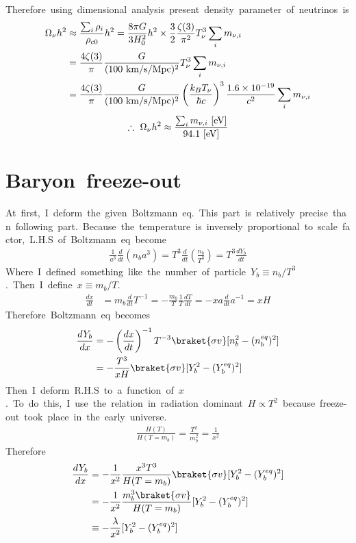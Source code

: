 Therefore\ using\ dimensional\ analysis\ present\ density\ parameter\ of\ neutrinos\ is
\begin{align*}
    \Omega_{\nu}h^2&\approx\frac{\sum_i\rho_i}{\rho_{c0}}h^2=\frac{8\pi G}{3H^2_0}h^2\times\frac{3}{2}\frac{\zeta(3)}{\pi^2}T^3_{\nu}\sum_im_{\nu,i}\\
    &=\frac{4\zeta(3)}{\pi}\frac{G}{(100\ \rm{km/s/Mpc})^2}T^3_{\nu}\sum_im_{\nu,i}\\
    &=\frac{4\zeta(3)}{\pi}\frac{G}{(100\ \rm{km/s/Mpc})^2}\left(\frac{k_BT_{\nu}}{\hbar c}\right)^3\frac{1.6\times10^{-19}}{c^2}\sum_im_{\nu,i}
\end{align*}
\begin{align}
    \therefore\ \Omega_{\nu}h^2\approx\frac{\sum_im_{\nu,i}\ \rm{[eV]}}{94.1\ \rm{[eV]}}
\end{align}

\section{Baryon\ freeze-out}
At\ first,\ I\ deform\ the\ given\ Boltzmann\ eq.\ This\ part\ is\ relatively\ precise\ than\ following\ part.\ Because\ the\ temperature\ is\ inversely\ proportional\ to\ scale\ factor,\ L.H.S\ of\ Boltzmann\ eq\ become
\begin{align*}
    \frac{1}{a^3}\frac{d}{dt}(n_ba^3)=T^3\frac{d}{dt}\left(\frac{n_b}{T^3}\right)=T^3\frac{dY_b}{dt}
\end{align*}
Where\ I\ defined\ something\ like\ the\ number\ of\ particle\ $Y_b\equiv n_b/T^3$.\ Then\ I\ define\ $x\equiv m_b/T$.
\begin{align*}
    \frac{dx}{dt}&=m_b\frac{d}{dt}T^{-1}=-\frac{m_b}{T}\frac{1}{T}\frac{dT}{dt}=-xa\frac{d}{dt}a^{-1}=xH
\end{align*}
Therefore\ Boltzmann\ eq\ becomes
\begin{align*}
    \frac{dY_b}{dx}&=-\left(\frac{dx}{dt}\right)^{-1}T^{-3}\braket{\sigma v}[n_b^2-(n_b^{eq})^2]\\
    &=-\frac{T^3}{xH}\braket{\sigma v}[Y_b^2-(Y_b^{eq})^2]
\end{align*}
Then\ I\ deform\ R.H.S\ to\ a\ function\ of\ $x$.\ To\ do\ this,\ I\ use\ the\ relation\ in\ radiation\ dominant\ $H\propto T^2$\ because\ freeze-out\ took\ place\ in\ the\ early\ universe.
\begin{align*}
    \frac{H(T)}{H(T=m_b)}=\frac{T^2}{m_b^2}=\frac{1}{x^2}
\end{align*}
Therefore
\begin{align*}
    \frac{dY_b}{dx}&=-\frac{1}{x^2}\frac{x^3T^3}{H(T=m_b)}\braket{\sigma v}[Y_b^2-(Y_b^{eq})^2]\\
    &=-\frac{1}{x^2}\frac{m_b^3\braket{\sigma v}}{H(T=m_b)}[Y_b^2-(Y_b^{eq})^2]\\
    &\equiv-\frac{\lambda}{x^2}[Y_b^2-(Y_b^{eq})^2]
\end{align*}


